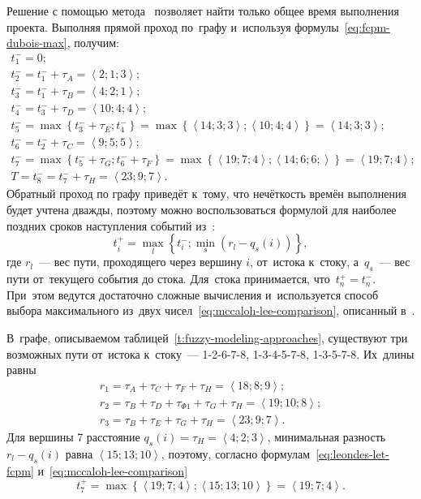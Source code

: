Решение с помощью метода~\cite{Uskov_FCPM, Dubois_Prade} позволяет найти только общее время выполнения проекта. Выполняя прямой проход по~графу и~используя формулы~\eqref{eq:fcpm-dubois-max}, получим:
\begin{gather*}
  t_1^{-} = 0; \\
  t_2^{-} = t_1^{-}+\tau_A = \left \langle 2;1;3 \right \rangle; \\
  t_3^{-} = t_1^{-}+\tau_B = \left \langle 4;2;1 \right \rangle; \\
  t_4^{-} = t_3^{-}+\tau_D = \left \langle 10;4;4 \right \rangle; \\
  t_5^{-} = \max \left \{ t_3^{-}+\tau_E; t_4^{-} \right \} = \max \left\{ \left \langle 14;3;3 \right \rangle; \left \langle 10;4;4 \right \rangle \right\} = \left \langle 14;3;3 \right \rangle; \\
  t_6^{-} = t_2^{-}+\tau_C = \left \langle 9;5;5 \right \rangle; \\
  t_7^{-} = \max \left \{ t_5^{-}+\tau_G; t_6^{-}+\tau_F \right \} = \max \left\{ \left \langle 19;7;4 \right \rangle; \left \langle 14;6;6; \right \rangle \right\} = \left \langle 19;7;4 \right \rangle; \\
  T = t_8^{-} = t_7^{-} + \tau_H = \left \langle 23;9;7 \right \rangle.
\end{gather*}
Обратный проход по графу приведёт к~тому, что нечёткость времён выполнения будет учтена дважды, поэтому можно воспользоваться формулой для наиболее поздних сроков наступления событий из~\cite{Leondes}:
\begin{equation}
\label{eq:leondes-let-fcpm}
  t_i^{+} = \underset{l}{\max} \left\{ t_i^{-}; \underset{s}{\min} \left(r_l - q_s\left(i \right) \right) \right \},
\end{equation}
где $r_l$~--- вес пути, проходящего через вершину $i$, от~истока к~стоку, а~$q_s$~--- вес пути от~текущего события до стока. Для~стока принимается, что~$t_n^{+}=t_n^{-}$. При~этом ведутся достаточно сложные вычисления и~используется способ выбора максимального из~двух чисел~\eqref{eq:mccaloh-lee-comparison}, описанный в~\cite{McCahon_Lee}.

В~графе, описываемом таблицей~\ref{t:fuzzy-modeling-approaches}, существуют три возможных пути от~истока к~стоку~--- 1-2-6-7-8, 1-3-4-5-7-8, 1-3-5-7-8. Их~длины равны
\begin{gather*}
  r_1 = \tau_A+\tau_C+\tau_F+\tau_H = \left \langle 18; 8; 9 \right \rangle; \\
  r_2 = \tau_B+\tau_D+\tau_{\Phi 1}+\tau_G+\tau_H = \left \langle 19; 10; 8 \right \rangle; \\
  r_3 = \tau_B+\tau_E+\tau_G+\tau_H = \left \langle 23; 9; 7 \right \rangle.
\end{gather*}
Для вершины 7 расстояние $q_s\left(i\right) = \tau_H = \left \langle 4;2;3  \right \rangle$, минимальная разность $r_l - q_s\left(i \right)$ равна $\left \langle 15; 13; 10 \right \rangle$, поэтому, согласно формулам~\eqref{eq:leondes-let-fcpm} и~\eqref{eq:mccaloh-lee-comparison}
\begin{equation*}
  t_7^{+}=\max \left\{ \left \langle 19;7;4 \right \rangle; \left \langle 15;13;10 \right \rangle \right\} = \left \langle 19;7;4 \right \rangle.
\end{equation*}

